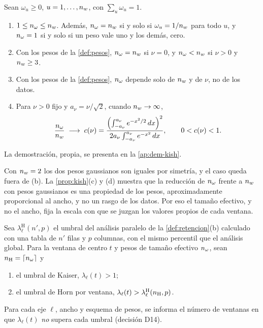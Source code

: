 \begin{proposicion}\label{prop:kish}
Sean $\omega_u\ge0$, $u=1,\dots,n_{w}$, con $\sum_u\omega_u=1$.
\begin{enumerate}[label=(\alph*)]
  \item $1\le n_{\omega}\le n_{w}$. Además, $n_{\omega}=n_{w}$ si y solo si $\omega_u=1/n_{w}$ para todo $u$, y
    $n_{\omega}=1$ si y solo si un peso vale uno y los demás, cero.
  \item Con los pesos de la \cref{def:pesos}, $n_{\omega}=n_{w}$ si $\nu=0$, y $n_{\omega}<n_{w}$ si $\nu>0$
    y $n_{w}\ge3$.
  \item Con los pesos de la \cref{def:pesos}, $n_{\omega}$ depende solo de $n_{w}$ y de $\nu$, no de los
    datos.
  \item Para $\nu>0$ fijo y $a_\nu=\nu/\sqrt2$, cuando $n_{w}\to\infty$,
    \[
      \frac{n_{\omega}}{n_{w}}\;\longrightarrow\;c(\nu)=
      \frac{\Bigl(\int_{-a_\nu}^{a_\nu}e^{-x^2/2}\,dx\Bigr)^2}{2a_\nu\int_{-a_\nu}^{a_\nu}e^{-x^2}\,dx},
      \qquad 0<c(\nu)<1 .
    \]
\end{enumerate}
\end{proposicion}

La demostración, propia, se presenta en la \cref{ap:dem-kish}.

Con $n_{w}=2$ los dos pesos gaussianos son iguales por simetría, y el caso queda fuera de (b). La
\cref{prop:kish}(c) y (d) muestra que la reducción de $n_{\omega}$ frente a $n_{w}$ con pesos
gaussianos es una propiedad de los pesos, aproximadamente proporcional al ancho, y no un rasgo de
los datos. Por eso el tamaño efectivo, y no el ancho, fija la escala con que se juzgan los
valores propios de cada ventana.

\begin{definicion}\label{def:umbral-ventana}
Sea $\lambda^{\mathrm H}_\ell(n',p)$ el umbral del análisis paralelo de la \cref{def:retencion}(b)
calculado con una tabla de $n'$ filas y $p$ columnas, con el mismo percentil que el análisis
global. Para la ventana de centro $t$ y pesos de tamaño efectivo $n_{\omega}$, sean
$n_{\mathrm{H}}=\lceil n_{\omega}\rceil$ y
\begin{enumerate}[label=(\alph*)]
  \item el umbral de Kaiser, $\lambda_\ell(t)>1$;
  \item el umbral de Horn por ventana, $\lambda_\ell(t)>\lambda^{\mathrm H}_\ell(n_{\mathrm{H}},p)$.
\end{enumerate}
Para cada eje $\ell$, ancho y esquema de pesos, se informa el número de ventanas en que
$\lambda_\ell(t)$ \emph{no} supera cada umbral (decisión D14).
\end{definicion}

